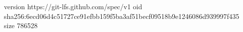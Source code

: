version https://git-lfs.github.com/spec/v1
oid sha256:6ecd06d4c51727ce91efbb159f5ba3af51becf09518b9e1246086d939997f435
size 786528
